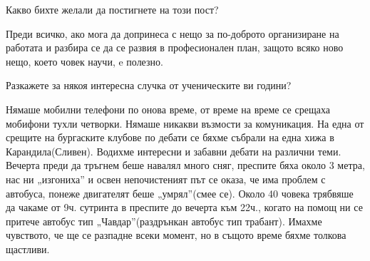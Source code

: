 \begin{multicols}{3}
Какво бихте желали да постигнете на този пост?

Преди всичко, ако мога да допринеса с нещо за по-доброто организиране на работата и разбира се да се развия в професионален план, защото всяко ново нещо, което човек научи, e полезно.

Разкажете за някоя интересна случка от ученическите ви години?

Нямаше мобилни телефони по онова време, от време на време се срещаха мобифони тухли четворки. Нямаше никакви възмости за комуникация. На една от срещите на бургаските клубове по дебати се бяхме събрали на една хижа в Карандила(Сливен). 
Водихме интересни и забавни дебати на различни теми. Вечерта преди да тръгнем беше навалял много сняг, преспите бяха около 3 метра, нас ни „изгониха” и освен непочистеният път се оказа, че има проблем с автобуса, понеже двигателят беше „умрял”(смее се). Около 40 човека трябвяше да чакаме от 9ч. сутринта  в преспите 
до вечерта към 22ч., когато на помощ ни се притече автобус тип 
„Чавдар”(раздрънкан автобус тип трабант). Имахме чувството, че ще се разпадне всеки момент, но в същото време бяхме толкова щастливи.

\closearticle
\end{multicols}
